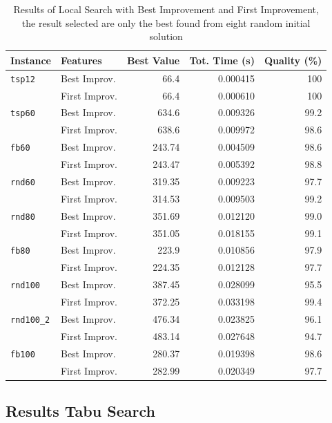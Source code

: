 	\begin{table}[H]
		\centering
		\begin{tabular}{llrrr}
			\toprule
			\textbf{Instance} & \textbf{Features} & \textbf{Best Value} & \textbf{Tot. Time (s)} & \textbf{Quality (\%)} \\
			\midrule
			\verb|tsp12| & Best Improv. & 66.4 & 0.000415 & 100 \\
							& First Improv. & 66.4 & 0.000610 & 100 \\
			\midrule
			\verb|tsp60| 	& Best Improv. & 634.6 & 0.009326 & 99.2 \\
							& First Improv. & 638.6 & 0.009972 & 98.6 \\
			\midrule
			\verb|fb60|		& Best Improv. & 243.74 & 0.004509 & 98.6 \\
							& First Improv. & 243.47 & 0.005392 & 98.8 \\ 
			\midrule
			\verb|rnd60| 	& Best Improv. & 319.35 & 0.009223 & 97.7 \\
							& First Improv. & 314.53 & 0.009503 & 99.2 \\
			\midrule
			\verb|rnd80| 	& Best Improv. & 351.69 & 0.012120 & 99.0 \\
							& First Improv. & 351.05 & 0.018155 & 99.1 \\
			\midrule
			\verb|fb80| 	& Best Improv. & 223.9 & 0.010856 & 97.9 \\
							& First Improv. & 224.35 & 0.012128 & 97.7 \\
			\midrule
			\verb|rnd100| 	& Best Improv. & 387.45 & 0.028099 & 95.5 \\
							& First Improv. & 372.25 & 0.033198 & 99.4 \\
			\midrule
			\verb|rnd100_2| & Best Improv. & 476.34 & 0.023825 & 96.1 \\
							& First Improv. & 483.14 & 0.027648 & 94.7 \\
			\midrule
			\verb|fb100| & Best Improv. & 280.37 & 0.019398 & 98.6 \\
						& First Improv. & 282.99 & 0.020349 & 97.7 \\
			\bottomrule
		\end{tabular}
		\caption{\label{tab:LS-BestStrategyResult} Results of Local Search with Best Improvement and First Improvement, the result selected are only the best found from eight random initial solution}
	\end{table}
	
\newpage
\subsection{Results Tabu Search}
	
